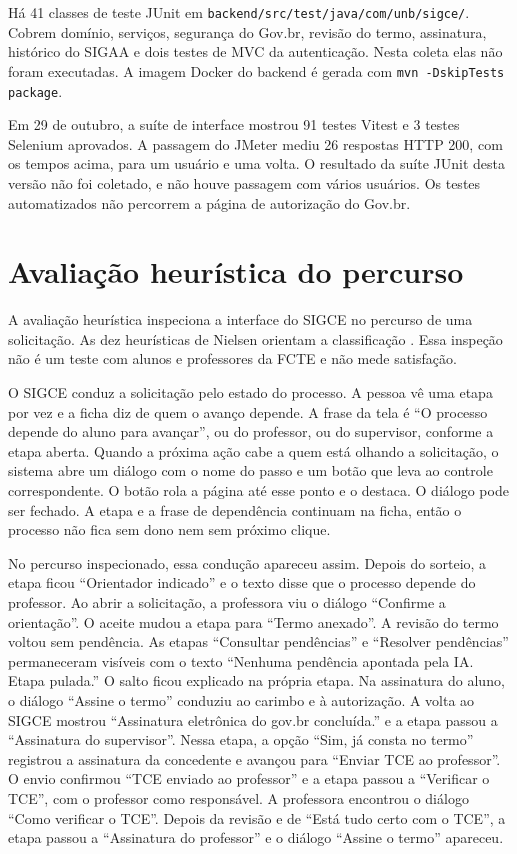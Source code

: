 Há 41 classes de teste JUnit em \texttt{backend/\allowbreak src/\allowbreak test/\allowbreak java/\allowbreak com/\allowbreak unb/\allowbreak sigce/}. Cobrem domínio, serviços, segurança do Gov.br, revisão do termo, assinatura, histórico do SIGAA e dois testes de MVC da autenticação. Nesta coleta elas não foram executadas. A imagem Docker do backend é gerada com \texttt{mvn -DskipTests package}.

Em 29 de outubro, a suíte de interface mostrou 91 testes Vitest e 3 testes Selenium aprovados. A passagem do JMeter mediu 26 respostas HTTP 200, com os tempos acima, para um usuário e uma volta. O resultado da suíte JUnit desta versão não foi coletado, e não houve passagem com vários usuários. Os testes automatizados não percorrem a página de autorização do Gov.br.

\section{Avaliação heurística do percurso}

A avaliação heurística inspeciona a interface do SIGCE no percurso de uma solicitação. As dez heurísticas de Nielsen orientam a classificação \cite{nielsen1994heuristic}. Essa inspeção não é um teste com alunos e professores da FCTE e não mede satisfação.

O SIGCE conduz a solicitação pelo estado do processo. A pessoa vê uma etapa por vez e a ficha diz de quem o avanço depende. A frase da tela é ``O processo depende do aluno para avançar'', ou do professor, ou do supervisor, conforme a etapa aberta. Quando a próxima ação cabe a quem está olhando a solicitação, o sistema abre um diálogo com o nome do passo e um botão que leva ao controle correspondente. O botão rola a página até esse ponto e o destaca. O diálogo pode ser fechado. A etapa e a frase de dependência continuam na ficha, então o processo não fica sem dono nem sem próximo clique.

No percurso inspecionado, essa condução apareceu assim. Depois do sorteio, a etapa ficou ``Orientador indicado'' e o texto disse que o processo depende do professor. Ao abrir a solicitação, a professora viu o diálogo ``Confirme a orientação''. O aceite mudou a etapa para ``Termo anexado''. A revisão do termo voltou sem pendência. As etapas ``Consultar pendências'' e ``Resolver pendências'' permaneceram visíveis com o texto ``Nenhuma pendência apontada pela IA. Etapa pulada.'' O salto ficou explicado na própria etapa. Na assinatura do aluno, o diálogo ``Assine o termo'' conduziu ao carimbo e à autorização. A volta ao SIGCE mostrou ``Assinatura eletrônica do gov.br concluída.'' e a etapa passou a ``Assinatura do supervisor''. Nessa etapa, a opção ``Sim, já consta no termo'' registrou a assinatura da concedente e avançou para ``Enviar TCE ao professor''. O envio confirmou ``TCE enviado ao professor'' e a etapa passou a ``Verificar o TCE'', com o professor como responsável. A professora encontrou o diálogo ``Como verificar o TCE''. Depois da revisão e de ``Está tudo certo com o TCE'', a etapa passou a ``Assinatura do professor'' e o diálogo ``Assine o termo'' apareceu.

